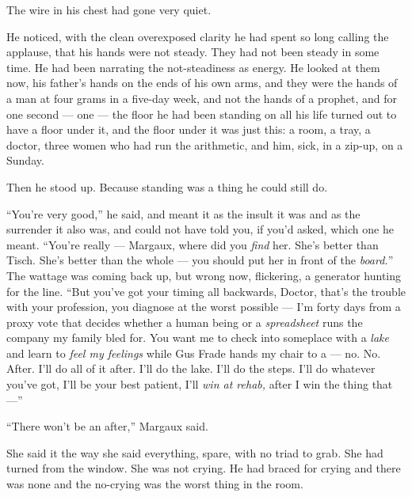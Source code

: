 \documentclass[11pt,openany]{book}
\newcommand{\scenebreak}{\par\vspace{0.5\baselineskip}\begin{center}\textasteriskcentered\quad\textasteriskcentered\quad\textasteriskcentered\end{center}\vspace{0.5\baselineskip}\par}
\begin{document}
The wire in his chest had gone very quiet.

He noticed, with the clean overexposed clarity he had spent so long calling the applause, that his hands were not steady. They had not been steady in some time. He had been narrating the not-steadiness as energy. He looked at them now, his father's hands on the ends of his own arms, and they were the hands of a man at four grams in a five-day week, and not the hands of a prophet, and for one second --- one --- the floor he had been standing on all his life turned out to have a floor under it, and the floor under it was just this: a room, a tray, a doctor, three women who had run the arithmetic, and him, sick, in a zip-up, on a Sunday.


\scenebreak


Then he stood up. Because standing was a thing he could still do.

``You're very good,'' he said, and meant it as the insult it was and as the surrender it also was, and could not have told you, if you'd asked, which one he meant. ``You're really --- Margaux, where did you \textit{find} her. She's better than Tisch. She's better than the whole --- you should put her in front of the \textit{board.}'' The wattage was coming back up, but wrong now, flickering, a generator hunting for the line. ``But you've got your timing all backwards, Doctor, that's the trouble with your profession, you diagnose at the worst possible --- I'm forty days from a proxy vote that decides whether a human being or a \textit{spreadsheet} runs the company my family bled for. You want me to check into someplace with a \textit{lake} and learn to \textit{feel my feelings} while Gus Frade hands my chair to a --- no. No. After. I'll do all of it after. I'll do the lake. I'll do the steps. I'll do whatever you've got, I'll be your best patient, I'll \textit{win at rehab,} after I win the thing that ---''

``There won't be an after,'' Margaux said.

She said it the way she said everything, spare, with no triad to grab. She had turned from the window. She was not crying. He had braced for crying and there was none and the no-crying was the worst thing in the room.
\end{document}
